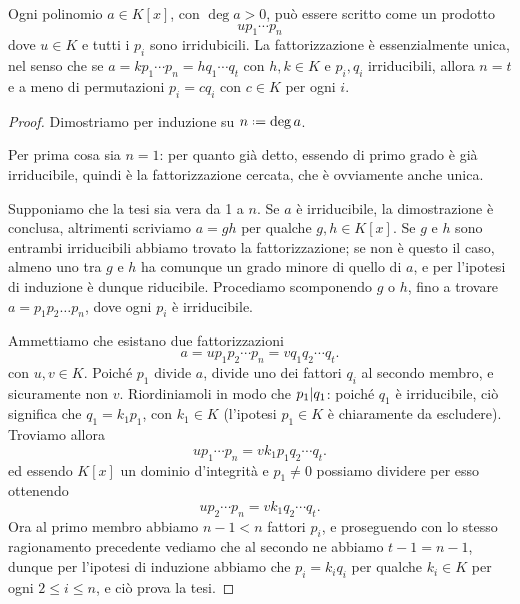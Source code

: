\begin{teorema} \label{t:fattorizzazione-unica}
	Ogni polinomio $a\in K[x]$, con $\deg a>0$, può essere scritto come un prodotto
	\begin{equation}
		up_1\cdots p_n
	\end{equation}
	dove $u\in K$ e tutti i $p_i$ sono irridubicili.
	La fattorizzazione è essenzialmente unica, nel senso che se $a=kp_1\cdots p_n=hq_1\cdots q_t$ con $h,k\in K$ e $p_i,q_i$ irriducibili, allora $n=t$ e a meno di permutazioni $p_i=cq_i$ con $c\in K$ per ogni $i$.
\end{teorema}
\begin{proof}
	Dimostriamo per induzione su $n\defeq\deg a$.

	Per prima cosa sia $n=1$: per quanto già detto, essendo di primo grado è già irriducibile, quindi è la fattorizzazione cercata, che è ovviamente anche unica.

	Supponiamo che la tesi sia vera da 1 a $n$.
	Se $a$ è irriducibile, la dimostrazione è conclusa, altrimenti scriviamo $a=gh$ per qualche $g,h\in K[x]$.
	Se $g$ e $h$ sono entrambi irriducibili abbiamo trovato la fattorizzazione; se non è questo il caso, almeno uno tra $g$ e $h$ ha comunque un grado minore di quello di $a$, e per l'ipotesi di induzione è dunque riducibile.
	Procediamo scomponendo $g$ o $h$, fino a trovare $a=p_1p_2\dots p_n$, dove ogni $p_i$ è irriducibile.
	
	Ammettiamo che esistano due fattorizzazioni
	\begin{equation}
		a=up_1p_2\cdots p_n=vq_1q_2\cdots q_t.
	\end{equation}
	con $u,v\in K$.
	Poich\'e $p_1$ divide $a$, divide uno dei fattori $q_i$ al secondo membro, e sicuramente non $v$.
	Riordiniamoli in modo che $p_1| q_1$: poich\'e $q_1$ è irriducibile, ciò significa che $q_1=k_1p_1$, con $k_1\in K$ (l'ipotesi $p_1\in K$ è chiaramente da escludere).
	Troviamo allora 
	\begin{equation}
		up_1\cdots p_n=vk_1p_1q_2\cdots q_t.
	\end{equation}
	ed essendo $K[x]$ un dominio d'integrità e $p_1\ne 0$ possiamo dividere per esso ottenendo
	\begin{equation}
		up_2\cdots p_n=vk_1q_2\cdots q_t.
	\end{equation}
	Ora al primo membro abbiamo $n-1<n$ fattori $p_i$, e proseguendo con lo stesso ragionamento precedente vediamo che al secondo ne abbiamo $t-1=n-1$, dunque per l'ipotesi di induzione abbiamo che $p_i=k_iq_i$ per qualche $k_i\in K$ per ogni $2\le i\le n$, e ciò prova la tesi.
\end{proof}
